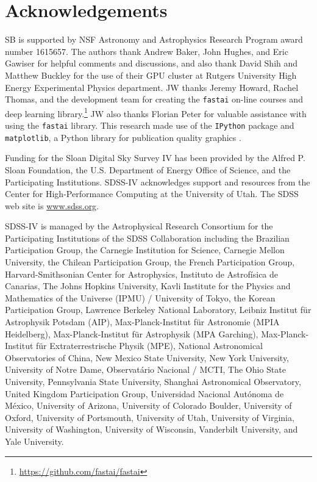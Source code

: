 \documentclass[fleqn,usenatbib]{mnras}
\begin{document}


\section*{Acknowledgements}

SB is supported by NSF Astronomy and Astrophysics Research Program award number 1615657.
The authors thank Andrew Baker, John Hughes, and Eric Gawiser for helpful comments and discussions, and also thank David Shih and Matthew Buckley for the use of their GPU cluster at Rutgers University High Energy Experimental Physics department. %
JW thanks Jeremy Howard, Rachel Thomas, and the development team for creating the \texttt{fastai} on-line courses and deep learning library.\footnote{\url{https://github.com/fastai/fastai}}
JW also thanks Florian Peter for valuable assistance with using the \texttt{fastai} library.
This research made use of the {\tt IPython} package \citep{Perez2007} and {\tt matplotlib}, a Python library for publication quality graphics \citep{Hunter2007}.

Funding for the Sloan Digital Sky Survey IV has been provided by the Alfred P. Sloan Foundation, the U.S. Department of Energy Office of Science, and the Participating Institutions. SDSS-IV acknowledges
support and resources from the Center for High-Performance Computing at
the University of Utah. The SDSS web site is \url{www.sdss.org}.

SDSS-IV is managed by the Astrophysical Research Consortium for the
Participating Institutions of the SDSS Collaboration including the
Brazilian Participation Group, the Carnegie Institution for Science,
Carnegie Mellon University, the Chilean Participation Group, the French Participation Group, Harvard-Smithsonian Center for Astrophysics,
Instituto de Astrof\'isica de Canarias, The Johns Hopkins University,
Kavli Institute for the Physics and Mathematics of the Universe (IPMU) /
University of Tokyo, the Korean Participation Group, Lawrence Berkeley National Laboratory,
Leibniz Institut f\"ur Astrophysik Potsdam (AIP),
Max-Planck-Institut f\"ur Astronomie (MPIA Heidelberg),
Max-Planck-Institut f\"ur Astrophysik (MPA Garching),
Max-Planck-Institut f\"ur Extraterrestrische Physik (MPE),
National Astronomical Observatories of China, New Mexico State University,
New York University, University of Notre Dame,
Observat\'ario Nacional / MCTI, The Ohio State University,
Pennsylvania State University, Shanghai Astronomical Observatory,
United Kingdom Participation Group,
Universidad Nacional Aut\'onoma de M\'exico, University of Arizona,
University of Colorado Boulder, University of Oxford, University of Portsmouth,
University of Utah, University of Virginia, University of Washington, University of Wisconsin,
Vanderbilt University, and Yale University.
\end{document}
